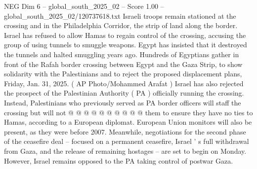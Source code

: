 \begin{textsample}{NEG Dim 6 – global\_south\_2025\_02 – Score 1.00 – global\_south\_2025\_02/120737618.txt}
Israeli troops remain stationed at the crossing and in the Philadelphia Corridor, the strip of land along the border.
Israel has refused to allow Hamas to regain control of the crossing, accusing the group of using tunnels to smuggle weapons.
Egypt has insisted that it destroyed the tunnels and halted smuggling years ago.
Hundreds of Egyptians gather in front of the Rafah border crossing between Egypt and the Gaza Strip, to show solidarity with the Palestinians and to reject the proposed displacement plans, Friday, Jan. 31, 2025. ( AP Photo/Mohammed Arafat ) Israel has also rejected the prospect of the Palestinian Authority ( PA ) officially running the crossing.
Instead, Palestinians who previously served as PA border officers will staff the crossing but will not @ @ @ @ @ @ @ @ @ @ them to ensure they have no ties to Hamas, according to a European diplomat.
European Union monitors will also be present, as they were before 2007.
Meanwhile, negotiations for the second phase of the ceasefire deal -- focused on a permanent ceasefire, Israel ' s full withdrawal from Gaza, and the release of remaining hostages -- are set to begin on Monday.
However, Israel remains opposed to the PA taking control of postwar Gaza.

\end{textsample}
